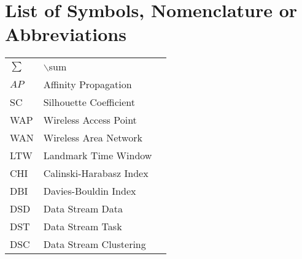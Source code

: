 \chapter*{List of Symbols, Nomenclature or
Abbreviations} 

\begin{table}[!h]
\begin{tabular}{l l r}
$\sum$  &       $\backslash$sum\\
$AP$    &       Affinity Propagation\\
SC      &       Silhouette Coefficient\\
WAP     &       Wireless Access Point\\
WAN     &       Wireless Area Network\\
LTW     &       Landmark Time Window\\
CHI     &       Calinski-Harabasz Index \\
DBI     &       Davies-Bouldin Index\\
DSD     &       Data Stream Data    \\
DST     &       Data Stream Task \\
DSC     &       Data Stream Clustering \\
\end{tabular}
\end{table}
